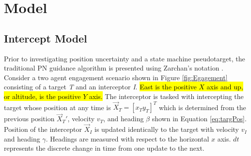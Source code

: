 \documentclass[conference]{IEEEtran}
\begin{document}
\section{Model}





\subsection{Intercept Model}
Prior to investigating position uncertainty and a state machine pseudotarget, the traditional PN guidance algorithm is presented using Zarchan's notation \cite{zarchan}. Consider a two agent engagement scenario shown in Figure \ref{fig:Egagement} consisting of a target \textit{T} and an interceptor \textit{I}. \hl{East is the positive $X$ axis and up, or altitude, is the positive $Y$ axis.} The interceptor is tasked with intercepting the target whose position at any time is $\overrightarrow{X}_T=[x_T y_T]^{T}$ which is determined from the previous position $\overrightarrow{X}_T'$, velocity $v_T$, and heading $\beta$ shown in Equation \ref{eq:targPos}. Position of the interceptor $\overrightarrow{X}_I$ is updated identically to the target with velocity $v_I$ and heading $\gamma$.  Headings are measured with respect to the horizontal $x$ axis. $dt$ represents the discrete change in time from one update to the next.

\end{document}
